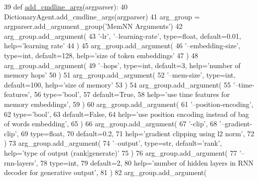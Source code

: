 \begin{DoxyCode}
39     \textcolor{keyword}{def }\hyperlink{namespaceparlai_1_1agents_1_1drqa_1_1config_a62fdd5554f1da6be0cba185271058320}{add\_cmdline\_args}(argparser):
40         DictionaryAgent.add\_cmdline\_args(argparser)
41         arg\_group = argparser.add\_argument\_group(\textcolor{stringliteral}{'MemNN Arguments'})
42         arg\_group.add\_argument(
43             \textcolor{stringliteral}{'-lr'}, \textcolor{stringliteral}{'--learning-rate'}, type=float, default=0.01, help=\textcolor{stringliteral}{'learning rate'}
44         )
45         arg\_group.add\_argument(
46             \textcolor{stringliteral}{'--embedding-size'}, type=int, default=128, help=\textcolor{stringliteral}{'size of token embeddings'}
47         )
48         arg\_group.add\_argument(
49             \textcolor{stringliteral}{'--hops'}, type=int, default=3, help=\textcolor{stringliteral}{'number of memory hops'}
50         )
51         arg\_group.add\_argument(
52             \textcolor{stringliteral}{'--mem-size'}, type=int, default=100, help=\textcolor{stringliteral}{'size of memory'}
53         )
54         arg\_group.add\_argument(
55             \textcolor{stringliteral}{'--time-features'},
56             type=\textcolor{stringliteral}{'bool'},
57             default=\textcolor{keyword}{True},
58             help=\textcolor{stringliteral}{'use time features for memory embeddings'},
59         )
60         arg\_group.add\_argument(
61             \textcolor{stringliteral}{'--position-encoding'},
62             type=\textcolor{stringliteral}{'bool'},
63             default=\textcolor{keyword}{False},
64             help=\textcolor{stringliteral}{'use position encoding instead of bag of words embedding'},
65         )
66         arg\_group.add\_argument(
67             \textcolor{stringliteral}{'-clip'},
68             \textcolor{stringliteral}{'--gradient-clip'},
69             type=float,
70             default=0.2,
71             help=\textcolor{stringliteral}{'gradient clipping using l2 norm'},
72         )
73         arg\_group.add\_argument(
74             \textcolor{stringliteral}{'--output'}, type=str, default=\textcolor{stringliteral}{'rank'}, help=\textcolor{stringliteral}{'type of output (rank|generate)'}
75         )
76         arg\_group.add\_argument(
77             \textcolor{stringliteral}{'--rnn-layers'},
78             type=int,
79             default=2,
80             help=\textcolor{stringliteral}{'number of hidden layers in RNN decoder for generative output'},
81         )
82         arg\_group.add\_argument(

\end{DoxyCode}

